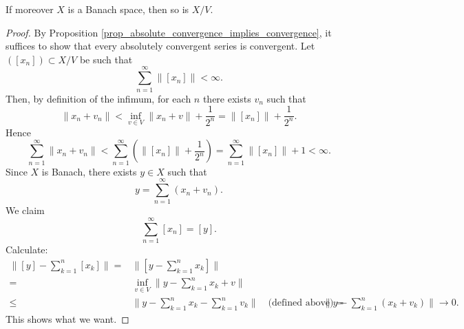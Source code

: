 \documentclass[12pt]{article}
\begin{document}
\begin{refsection}
\begin{proposition}
\label{prop_quotient_banach}
	If moreover $X$ is a Banach space, then so is $X/V$. 
\end{proposition}
\begin{proof}
	By Proposition \ref{prop_absolute_convergence_implies_convergence}, it suffices to show that every absolutely convergent series is convergent. Let $([x_n])\subset X/V$ be such that 
	\begin{equation*}
		\sum_{n=1}^\infty \|[x_n]\| < \infty.
	\end{equation*}
	Then, by definition of the infimum, for each $n$ there exists $v_n$ such that 
	\begin{equation*}
		\|x_n + v_n\| < \inf_{v\in V}\|x_n + v\| + \frac{1}{2^n} = \|[x_n]\| + \frac{1}{2^n}.
	\end{equation*}
	Hence
	\begin{equation*}
		\sum_{n=1}^\infty \|x_n + v_n\| < \sum_{n=1}^\infty \left( \|[x_n]\| + \frac{1}{2^n} \right) = \sum_{n=1}^\infty \|[x_n]\| + 1 < \infty.
	\end{equation*}
	Since $X$ is Banach, there exists $y\in X$ such that 
	\begin{equation*}
		y = \sum_{n=1}^\infty (x_n + v_n).
	\end{equation*}
	We claim 
	\begin{equation*}
		\sum_{n=1}^\infty [x_n] = [y].
	\end{equation*}
	Calculate:
	\begin{align*}
		\|[y] - \sum_{k=1}^n [x_k]\|
		=& \| [y - \sum_{k=1}^n x_k] \| \\
		=& \inf_{v\in V} \|y - \sum_{k=1}^n x_k + v \| \\
		\leq& \|y - \sum_{k=1}^n x_k - \sum_{k=1}^n v_k \| \quad \text{(defined above)}
		=& \|y - \sum_{k=1}^n (x_k + v_k) \| \to 0.
	\end{align*}
	This shows what we want.
\end{proof}


\nocite{wikipedia_weak}
\nocite{se_weakstar_distributions}
\printbibliography

\end{refsection}
\end{document}
